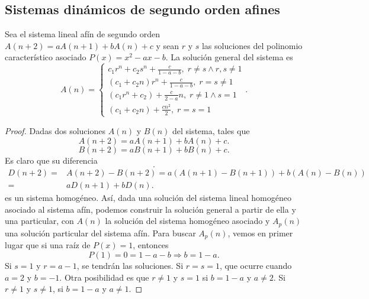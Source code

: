 \subsection{Sistemas dinámicos de segundo orden afines}
\begin{ftheorem}[]
\normalfont Sea el sistema lineal afín de segundo orden $\displaystyle A\left(n+2\right) = aA\left(n+1\right) + bA\left(n\right) + c $ y sean $\displaystyle r $ y $\displaystyle s $ las soluciones del polinomio característico asociado $\displaystyle P\left(x\right) = x^{2}-ax - b $. La solución general del sistema es
\[A\left(n\right) = 
\begin{cases}
c_{1}r^{n} + c_{2}s^{n} + \frac{c}{1 - a - b}, \; r \neq s \land r,s \neq 1 \\
\left(c_{1} + c_{2}n\right)r^{n} + \frac{c}{1-a-b}, \; r = s \neq 1 \\
\left(c_{1}r^{n}+c_{2}\right) + \frac{c}{2-a}n, \; r\neq 1 \land s = 1 \\
\left(c_{1}+c_{2}n\right) + \frac{cn^{2}}{2}, \; r = s = 1
\end{cases}
.\]
\end{ftheorem}
\begin{proof}
Dadas dos soluciones $\displaystyle A\left(n\right) $ y $\displaystyle B\left(n\right) $ del sistema, tales que 
\[A\left(n+2\right) = aA\left(n+1\right) + bA\left(n\right) + c .\]
\[B\left(n+2\right) = aB\left(n+1\right) + bB\left(n\right) + c .\]
Es claro que su diferencia
\[ .\]
\[
\begin{split}
	D\left(n+2\right) = & A\left(n+2\right)-B\left(n+2\right) = a\left(A\left(n+1\right)-B\left(n+1\right)\right) + b\left(A\left(n\right)-B\left(n\right)\right) \\
	= &  a D\left(n+1\right) + bD\left(n\right).
\end{split}
\]
es un sistema homogéneo. Así, dada una solución del sistema lineal homogéneo asociado al sistema afín, podemos construir la solución general a partir de ella y una particular, con $\displaystyle A\left(n\right) $ la solución del sistema homogéneo asociado y $\displaystyle A_{p}\left(n\right) $ una solución particular del sistema afín. Para buscar $\displaystyle A_{p}\left(n\right) $, vemos en primer lugar que si una raíz de $\displaystyle P\left(x\right) = 1 $, entonces 
\[P\left(1\right) = 0 = 1 - a - b \Rightarrow b = 1 - a .\]
Si $\displaystyle s = 1 $ y $\displaystyle r = a - 1 $, se tendrán las soluciones. Si $\displaystyle r = s = 1 $, que ocurre cuando $\displaystyle a = 2  $ y $\displaystyle b = - 1 $. Otra posibilidad es que $\displaystyle r \neq 1 $ y $\displaystyle s = 1 $ si $\displaystyle  b = 1 - a $ y $\displaystyle a \neq 2 $. Si $\displaystyle r \neq 1 $ y $\displaystyle s \neq 1 $, si $\displaystyle  b=1-a $ y $\displaystyle a \neq 1 $.
\end{proof}
